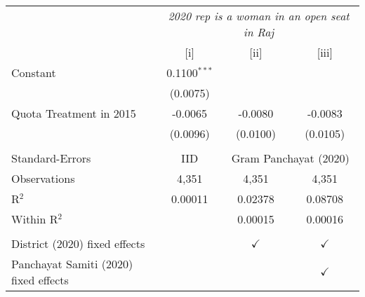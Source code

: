
\begingroup
\centering
\begin{tabular}{lccc}
   \toprule
    & \multicolumn{3}{c}{\textit{2020 rep is a woman in an open seat in Raj}}\\
                                         & [i]            & [ii]          & [iii]\\  
   \midrule 
   Constant                              & 0.1100$^{***}$ &               &   \\   
                                         & (0.0075)       &               &   \\   
   Quota Treatment in 2015               & -0.0065        & -0.0080       & -0.0083\\   
                                         & (0.0096)       & (0.0100)      & (0.0105)\\   
    \\
   Standard-Errors & IID & \multicolumn{2}{c}{Gram Panchayat (2020)} \\ 
   Observations                          & 4,351          & 4,351         & 4,351\\  
   R$^2$                                 & 0.00011        & 0.02378       & 0.08708\\  
   Within R$^2$                          &                & 0.00015       & 0.00016\\  
    \\
   District (2020) fixed effects         &                & $\checkmark$  & $\checkmark$\\   
   Panchayat Samiti (2020) fixed effects &                &               & $\checkmark$\\   
   \bottomrule
\end{tabular}
\par\endgroup


